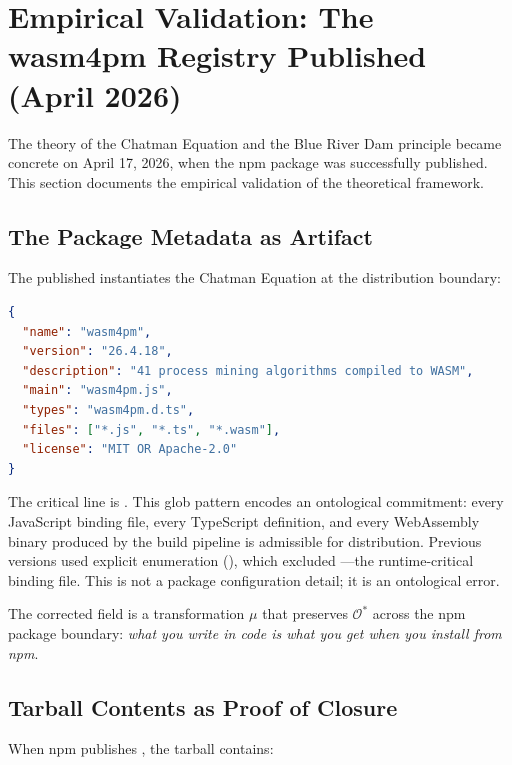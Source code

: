 \documentclass[11pt,a4paper]{article}
\theoremstyle{definition}
\begin{document}
\section{Empirical Validation: The wasm4pm Registry Published (April 2026)}

The theory of the Chatman Equation and the Blue River Dam principle became concrete on April 17, 2026, when the  npm package was successfully published. This section documents the empirical validation of the theoretical framework.

\subsection{The Package Metadata as Artifact}

The published  instantiates the Chatman Equation at the distribution boundary:

\begin{lstlisting}[language=json,caption={wasm4pm/pkg/package.json: the ontology made installable}]
{
  "name": "wasm4pm",
  "version": "26.4.18",
  "description": "41 process mining algorithms compiled to WASM",
  "main": "wasm4pm.js",
  "types": "wasm4pm.d.ts",
  "files": ["*.js", "*.ts", "*.wasm"],
  "license": "MIT OR Apache-2.0"
}
\end{lstlisting}

The critical line is . This glob pattern encodes an ontological commitment: every JavaScript binding file, every TypeScript definition, and every WebAssembly binary produced by the build pipeline is admissible for distribution. Previous versions used explicit enumeration (), which excluded ---the runtime-critical binding file. This is not a package configuration detail; it is an ontological error.

The corrected  field is a transformation $\mu$ that preserves $\mathcal{O}^*$ across the npm package boundary: \textit{what you write in code is what you get when you install from npm}.

\subsection{Tarball Contents as Proof of Closure}

When npm publishes , the tarball contains:
\end{document}
